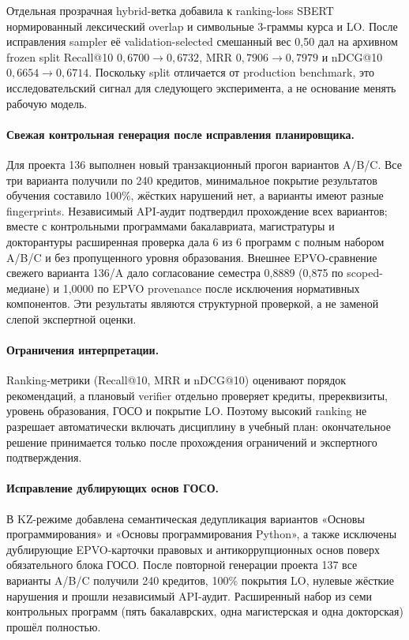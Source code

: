 \documentclass[twoside,11pt]{article}
\begin{document}
Отдельная прозрачная hybrid-ветка добавила к ranking-loss SBERT нормированный лексический overlap и символьные 3-граммы курса и LO. После исправления sampler её validation-selected смешанный вес 0,50 дал на архивном frozen split Recall@10 $0,6700\rightarrow0,6732$, MRR $0,7906\rightarrow0,7979$ и nDCG@10 $0,6654\rightarrow0,6714$. Поскольку split отличается от production benchmark, это исследовательский сигнал для следующего эксперимента, а не основание менять рабочую модель.

\paragraph{Свежая контрольная генерация после исправления планировщика.}
Для проекта 136 выполнен новый транзакционный прогон вариантов A/B/C. Все три варианта получили по 240 кредитов, минимальное покрытие результатов обучения составило 100\%, жёстких нарушений нет, а варианты имеют разные fingerprints. Независимый API-аудит подтвердил прохождение всех вариантов; вместе с контрольными программами бакалавриата, магистратуры и докторантуры расширенная проверка дала 6 из 6 программ с полным набором A/B/C и без пропущенного уровня образования. Внешнее EPVO-сравнение свежего варианта 136/A дало согласование семестра 0,8889 (0,875 по scoped-медиане) и 1,0000 по EPVO provenance после исключения нормативных компонентов. Эти результаты являются структурной проверкой, а не заменой слепой экспертной оценки.

\paragraph{Ограничения интерпретации.}
Ranking-метрики (Recall@10, MRR и nDCG@10) оценивают порядок рекомендаций, а плановый verifier отдельно проверяет кредиты, пререквизиты, уровень образования, ГОСО и покрытие LO. Поэтому высокий ranking не разрешает автоматически включать дисциплину в учебный план: окончательное решение принимается только после прохождения ограничений и экспертного подтверждения.

\paragraph{Исправление дублирующих основ ГОСО.}
В KZ-режиме добавлена семантическая дедупликация вариантов «Основы программирования» и «Основы программирования Python», а также исключены дублирующие EPVO-карточки правовых и антикоррупционных основ поверх обязательного блока ГОСО. После повторной генерации проекта 137 все варианты A/B/C получили 240 кредитов, 100\% покрытия LO, нулевые жёсткие нарушения и прошли независимый API-аудит. Расширенный набор из семи контрольных программ (пять бакалаврских, одна магистерская и одна докторская) прошёл полностью.
\end{document}
